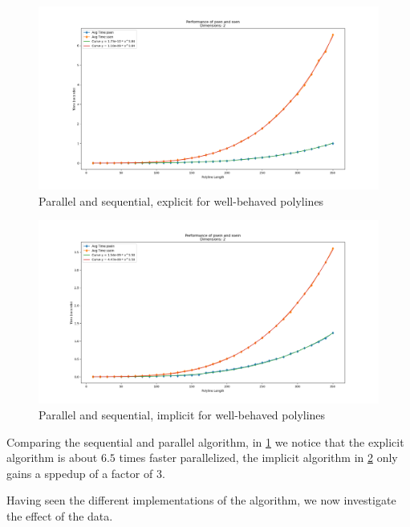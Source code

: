 \begin{figure}[ht]
  \centering
  \includegraphics[scale=0.5, width=\linewidth]{figures/psen-ssen.png}
  \caption{Parallel and sequential, explicit for well-behaved polylines}
  \label{fig:psen-ssen}
\end{figure}

\begin{figure}[ht]
  \centering
  \includegraphics[scale=0.5, width=\linewidth]{figures/psein-ssein.png}
  \caption{Parallel and sequential, implicit for well-behaved polylines}
  \label{fig:psein-ssein}
\end{figure}

Comparing the sequential and parallel algorithm, in \cref{fig:psen-ssen} we notice that the explicit algorithm is about \(6.5\) times faster parallelized, the implicit algorithm in \cref{fig:psein-ssein} only gains a sppedup of a factor of \(3\). 

Having seen the different implementations of the algorithm, we now investigate the effect of the data.

